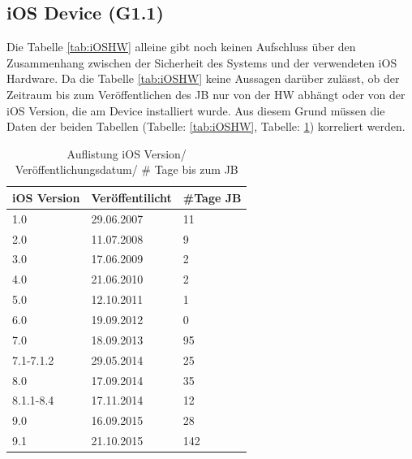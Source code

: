 \subsection{iOS Device (G1.1)}
\label{sec:Frage1iOSDevice} 

Die Tabelle \ref{tab:iOSHW} alleine gibt noch keinen Aufschluss über den Zusammenhang zwischen der Sicherheit des Systems und der verwendeten iOS Hardware. Da die Tabelle \ref{tab:iOSHW} keine Aussagen darüber zulässt, ob der Zeitraum bis zum Veröffentlichen des JB nur von der HW abhängt oder von der iOS Version, die am Device installiert wurde. Aus diesem Grund müssen die Daten der beiden Tabellen (Tabelle: \ref{tab:iOSHW}, Tabelle: \ref{tab:iOSVersion}) korreliert werden. \par 
\begin{table}[htp!]
    \begin{center}
        \begin{tabular}{|l|l|l|} \hline
         \textbf{iOS Version} & \textbf{Veröffentilicht} & \textbf{\#Tage JB}\\ \hline    
        1.0 & 29.06.2007 & 11\\ \hline 
        2.0 & 11.07.2008	& 9\\ \hline 
        3.0 & 17.06.2009	& 2\\ \hline 
        4.0 & 21.06.2010 & 2\\ \hline 
        5.0 & 12.10.2011	& 1\\ \hline 
        6.0 & 19.09.2012	& 0\\ \hline 
        7.0 & 18.09.2013	& 95\\ \hline 
        7.1-7.1.2 & 29.05.2014 & 25\\ \hline 
        8.0 & 17.09.2014	& 35\\ \hline 
        8.1.1-8.4 & 17.11.2014	& 12\\ \hline 
        9.0 & 16.09.2015	& 28\\ \hline
        9.1 & 21.10.2015	& 142\\ \hline 
        \end{tabular} 
        \caption{Auflistung iOS Version/ Veröffentlichungsdatum/ \# Tage bis zum JB}
        \label{tab:iOSVersion}
    \end{center}
\end{table}

